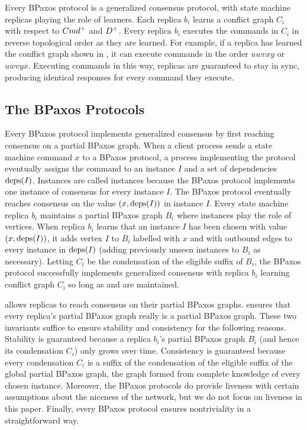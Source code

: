 Every BPaxos protocol is a generalized consensus protocol, with state machine
replicas playing the role of learners. Each replica $b_i$ learns a conflict
graph $C_i$ with respect to $Cmd^+$ and $D^+$. Every replica $b_i$
executes the commands in $C_i$ in reverse topological order as they are
learned. For example, if a replica has learned the conflict graph shown in
, it can execute commands in the order $uwvxy$ or $uwvyx$.
Executing commands in this way, replicas are guaranteed to stay in sync,
producing identical responses for every command they execute.

\subsection{The BPaxos Protocols}
Every BPaxos protocol implements generalized consensus by first reaching
consensus on a partial BPaxos graph.
%
When a client process sends a state machine command $x$ to a BPaxos protocol, a
process implementing the protocol eventually assigns the command to an instance
$I$ and a set of dependencies $\text{deps}(I)$.
%
Instances are called instances because the BPaxos protocol implements one
instance of consensus for every instance $I$. The BPaxos protocol eventually
reaches consensus on the value $(x, \text{deps}(I))$ in instance $I$.  Every state
machine replica $b_i$ maintains a partial BPaxos graph $B_i$ where instances
play the role of vertices. When replica $b_i$ learns that an instance $I$ has
been chosen with value $(x, \text{deps}(I))$, it adds vertex $I$ to $B_i$ labelled
with $x$ and with outbound edges to every instance in $\text{deps}(I)$ (adding
previously unseen instances to $B_i$ as necessary). Letting $C_i$ be the
condensation of the eligible suffix of $B_i$, the BPaxos protocol successfully
implements generalized consensus with replica $b_i$ learning conflict graph
$C_i$ so long as  and  are
maintained.

 allows replicas to reach consensus on their partial
BPaxos graphs.  ensures that every replica's partial
BPaxos graph really is a partial BPaxos graph. These two invariants suffice to
ensure stability and consistency for the following reasons.
%
Stability is guaranteed because a replica $b_i$'s partial BPaxos graph $B_i$
(and hence its condensation $C_i$) only grows over time.
%
Consistency is guaranteed because every condensation $C_i$ is a suffix of the
condensation of the eligible suffix of the global partial BPaxos graph, the
graph formed from complete knowledge of every chosen instance.
%
Moreover, the BPaxos protocols do provide liveness with certain assumptions
about the niceness of the network, but we do not focus on liveness in this
paper.
%
Finally, every BPaxos protocol ensures nontriviality in a straightforward way.
